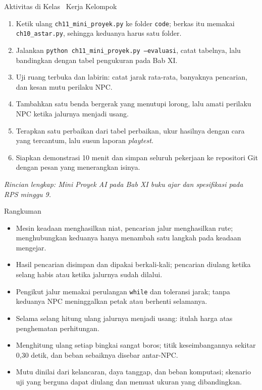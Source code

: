\documentclass[aspectratio=169,10pt]{beamer}
\begin{document}
\begin{frame}{Aktivitas di Kelas \textperiodcentered\ Kerja Kelompok}
\begin{enumerate}
  \item Ketik ulang \texttt{ch11\_mini\_proyek.py} ke folder \texttt{code};
        berkas itu memakai \texttt{ch10\_astar.py}, sehingga keduanya harus
        satu folder.
  \item Jalankan \texttt{python ch11\_mini\_proyek.py --evaluasi}, catat
        tabelnya, lalu bandingkan dengan tabel pengukuran pada Bab XI.
  \item Uji ruang terbuka dan labirin: catat jarak rata-rata, banyaknya
        pencarian, dan kesan mutu perilaku NPC.
  \item Tambahkan satu benda bergerak yang menutupi lorong, lalu amati perilaku
        NPC ketika jalurnya menjadi usang.
  \item Terapkan satu perbaikan dari tabel perbaikan, ukur hasilnya dengan cara
        yang tercantum, lalu susun laporan \emph{playtest}.
  \item Siapkan demonstrasi 10 menit dan simpan seluruh pekerjaan ke repositori
        Git dengan pesan yang menerangkan isinya.
\end{enumerate}
\vspace{0.10cm}
{\footnotesize\color{ubAccent}\itshape Rincian lengkap: Mini Proyek AI pada
Bab XI buku ajar dan spesifikasi pada RPS minggu 9.}
\end{frame}

\begin{frame}{Rangkuman}
\begin{itemize}
  \item Mesin keadaan menghasilkan niat, pencarian jalur menghasilkan rute;
        menghubungkan keduanya hanya menambah satu langkah pada keadaan
        mengejar.
  \item Hasil pencarian disimpan dan dipakai berkali-kali; pencarian diulang
        ketika selang habis atau ketika jalurnya sudah dilalui.
  \item Pengikut jalur memakai perulangan \texttt{while} dan toleransi jarak;
        tanpa keduanya NPC meninggalkan petak atau berhenti selamanya.
  \item Selama selang hitung ulang jalurnya menjadi usang: itulah harga atas
        penghematan perhitungan.
  \item Menghitung ulang setiap bingkai sangat boros; titik keseimbangannya
        sekitar 0,30 detik, dan beban sebaiknya disebar antar-NPC.
  \item Mutu dinilai dari kelancaran, daya tanggap, dan beban komputasi; skenario
        uji yang berguna dapat diulang dan memuat ukuran yang dibandingkan.
\end{itemize}
\end{frame}
\end{document}
